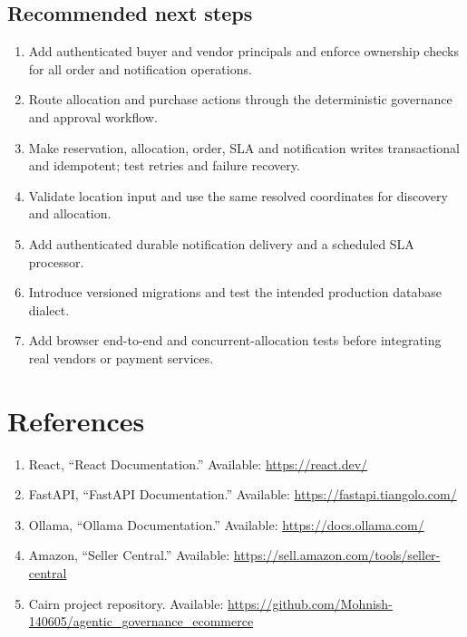 \documentclass[12pt,a4paper]{report}
\begin{document}
\section{Recommended next steps}
\begin{enumerate}
  \item Add authenticated buyer and vendor principals and enforce ownership
        checks for all order and notification operations.
  \item Route allocation and purchase actions through the deterministic
        governance and approval workflow.
  \item Make reservation, allocation, order, SLA and notification writes
        transactional and idempotent; test retries and failure recovery.
  \item Validate location input and use the same resolved coordinates for
        discovery and allocation.
  \item Add authenticated durable notification delivery and a scheduled SLA
        processor.
  \item Introduce versioned migrations and test the intended production
        database dialect.
  \item Add browser end-to-end and concurrent-allocation tests before
        integrating real vendors or payment services.
\end{enumerate}

\chapter*{References}
\begin{enumerate}
  \item React, ``React Documentation.'' Available:
        \url{https://react.dev/}
  \item FastAPI, ``FastAPI Documentation.'' Available:
        \url{https://fastapi.tiangolo.com/}
  \item Ollama, ``Ollama Documentation.'' Available:
        \url{https://docs.ollama.com/}
  \item Amazon, ``Seller Central.'' Available:
        \url{https://sell.amazon.com/tools/seller-central}
  \item Cairn project repository. Available:
        \url{https://github.com/Mohnish-140605/agentic_governance_ecommerce}
\end{enumerate}
\end{document}
